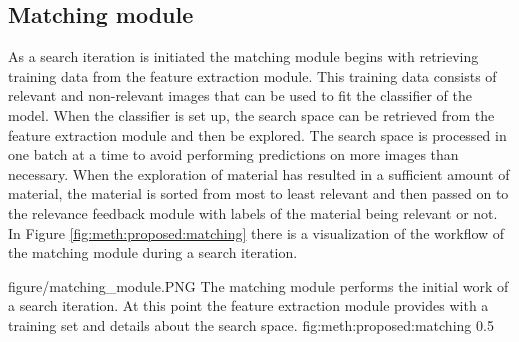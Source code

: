 \subsection{Matching module}
\label{sec:meth:proposed:matching}
As a search iteration is initiated the matching module begins with retrieving training data from the feature extraction module. This training data consists of relevant and non-relevant images that can be used to fit the classifier of the model. When the classifier is set up, the search space can be retrieved from the feature extraction module and then be explored. The search space is processed in one batch at a time to avoid performing predictions on more images than necessary. When the exploration of material has resulted in a sufficient amount of material, the material is sorted from most to least relevant and then passed on to the relevance feedback module with labels of the material being relevant or not. 
In Figure \ref{fig:meth:proposed:matching} there is a visualization of the workflow of the matching module during a search iteration. 

\singlefigure
{figure/matching_module.PNG}
{The matching module performs the initial work of a search iteration. At this point the feature extraction module provides with a training set and details about the search space.}
{fig:meth:proposed:matching}
{0.5}




